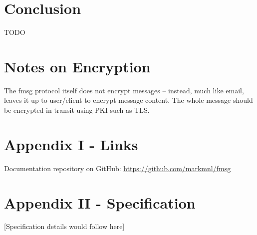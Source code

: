 \documentclass[11pt, a4paper]{article}
\begin{document}
\section{Conclusion}
TODO

\section{Notes on Encryption}
The fmsg protocol itself does not encrypt messages – instead, much like email, leaves it up to user/client to encrypt message content. The whole message should be encrypted in transit using PKI such as TLS.

\appendix
\section{Appendix I - Links}
Documentation repository on GitHub: \url{https://github.com/markmnl/fmsg}

\section{Appendix II - Specification}
[Specification details would follow here]
\end{document}
